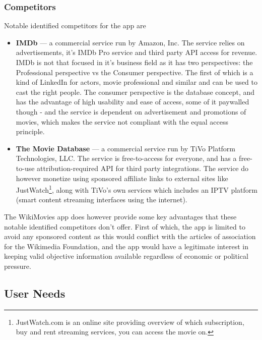 \documentclass[11pt]{article}
\begin{document}
\subsubsection{Competitors}
Notable identified competitors for the app are
\begin{itemize}
  \item \textbf{IMDb} — a commercial service run by Amazon, Inc. The service relies on advertisements, it's IMDb Pro service and third party API access for revenue. IMDb is not that focused in it's business field as it has two perspectives: the Professional perspective vs the Consumer perspective. The first of which is a kind of LinkedIn for actors, movie professional and similar and can be used to cast the right people. The consumer perspective is the database concept, and has the advantage of high usability and ease of access, some of it paywalled though - and the service is dependent on advertisement and promotions of movies, which makes the service not compliant with the equal access principle.
  \item \textbf{The Movie Database} — a commercial service run by TiVo Platform Technologies, LLC. The service is free-to-access for everyone, and has a free-to-use attribution-required API for third party integrations. The service do however monetize using sponsored affiliate links to external sites like JustWatch\footnote{JustWatch.com is an online site providing overview of which subscription, buy and rent streaming services, you can access the movie on.}, along with TiVo's own services which includes an IPTV platform (smart content streaming interfaces using the internet).
\end{itemize}

The WikiMovies app does however provide some key advantages that these notable identified competitors don't offer. First of which, the app is limited to avoid any sponsored content as this would conflict with the articles of association for the Wikimedia Foundation, and the app would have a legitimate interest in keeping valid objective information available regardless of economic or political pressure.


\subsection{User Needs}

\end{document}
